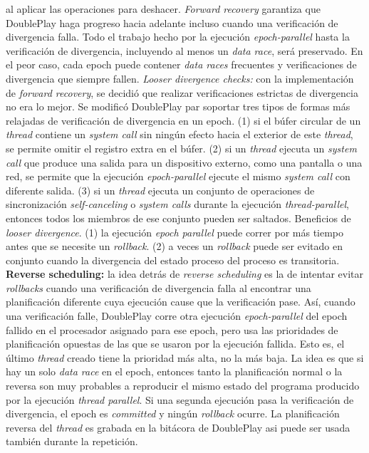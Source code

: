 al aplicar las operaciones para deshacer. \emph{Forward recovery} garantiza que DoublePlay haga progreso hacia adelante incluso cuando una verificación de divergencia falla. Todo el trabajo hecho por la ejecución \emph{epoch-parallel} hasta la verificación de divergencia, incluyendo al menos un \emph{data race}, será preservado. En el peor caso, cada epoch puede contener \emph{data races} frecuentes y verificaciones de divergencia que siempre fallen. \emph{Looser divergence checks:} con la implementación de \emph{forward recovery}, se decidió que realizar verificaciones estrictas de divergencia no era lo mejor. Se modificó DoublePlay par soportar tres tipos de formas más relajadas de verificación de divergencia en un epoch. (1) si el búfer circular de un \emph{thread} contiene un \emph{system call} sin ningún efecto hacia el exterior de este \emph{thread}, se permite omitir el registro extra en el búfer. (2) si un \emph{thread} ejecuta un \emph{system call} que produce una salida para un dispositivo externo, como una pantalla o una red, se permite que la ejecución \emph{epoch-parallel} ejecute el mismo \emph{system call} con diferente salida. (3) si un \emph{thread} ejecuta un conjunto de operaciones de sincronización \emph{self-canceling} o \emph{system calls} durante la ejecución \emph{thread-parallel}, entonces todos los miembros de ese conjunto pueden ser saltados. Beneficios de \emph{looser divergence}. (1) la ejecución \emph{epoch parallel} puede correr por más tiempo antes que se necesite un \emph{rollback}. (2) a veces un \emph{rollback} puede ser evitado en conjunto cuando la divergencia del estado proceso del proceso es transitoria. \textbf{Reverse scheduling:} la idea detrás de \emph{reverse scheduling} es la de intentar evitar \emph{rollbacks} cuando una verificación de divergencia falla al encontrar una planificación diferente cuya ejecución cause que la verificación pase. Así, cuando una verificación falle, DoublePlay corre otra ejecución \emph{epoch-parallel} del epoch fallido en el procesador asignado para ese epoch, pero usa las prioridades de planificación opuestas de las que se usaron por la ejecución fallida. Esto es, el último \emph{thread} creado tiene la prioridad más alta, no la más baja. La idea es que si hay un solo \emph{data race} en el epoch, entonces tanto la planificación normal o la reversa son muy probables a reproducir el mismo estado del programa producido por la ejecución \emph{thread parallel}. Si una segunda ejecución pasa la verificación de divergencia, el epoch es \emph{committed} y ningún \emph{rollback} ocurre. La planificación reversa del \emph{thread} es grabada en la bitácora de DoublePlay asi puede ser usada también durante la repetición.


